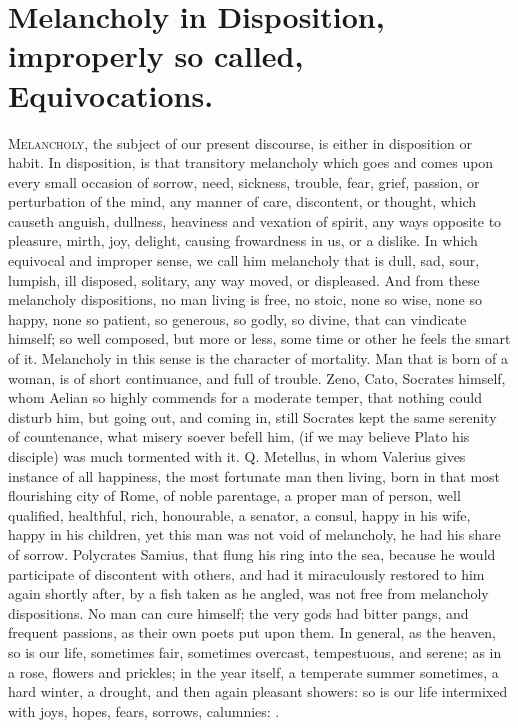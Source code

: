 {\section[Melancholic Disposition]{Melancholy in Disposition, improperly so called, Equivocations.}
\lettrine{M}{elancholy}, the subject of our present discourse, is either in
disposition or habit. In disposition, is that transitory melancholy
which goes and comes upon every small occasion of sorrow, need,
sickness, trouble, fear, grief, passion, or perturbation of the mind,
any manner of care, discontent, or thought, which causeth anguish,
dullness, heaviness and vexation of spirit, any ways opposite to
pleasure, mirth, joy, delight, causing frowardness in us, or a dislike.
In which equivocal and improper sense, we call him melancholy that is
dull, sad, sour, lumpish, ill disposed, solitary, any way moved, or
displeased. And from these melancholy dispositions, no man living
is free, no stoic, none so wise, none so happy, none so patient, so
generous, so godly, so divine, that can vindicate himself; so well
composed, but more or less, some time or other he feels the smart of
it. Melancholy in this sense is the character of mortality. Man
that is born of a woman, is of short continuance, and full of trouble.
Zeno, Cato, Socrates himself, whom Aelian so highly commends for a
moderate temper, that nothing could disturb him, but going out, and
coming in, still Socrates kept the same serenity of countenance, what
misery soever befell him, (if we may believe Plato his disciple) was
much tormented with it. Q. Metellus, in whom Valerius gives
instance of all happiness, the most fortunate man then living, born in
that most flourishing city of Rome, of noble parentage, a proper man of
person, well qualified, healthful, rich, honourable, a senator, a
consul, happy in his wife, happy in his children, \etc{} yet this man was
not void of melancholy, he had his share of sorrow. Polycrates
Samius, that flung his ring into the sea, because he would participate
of discontent with others, and had it miraculously restored to him
again shortly after, by a fish taken as he angled, was not free from
melancholy dispositions. No man can cure himself; the very gods had
bitter pangs, and frequent passions, as their own poets put upon
them. In general, as the heaven, so is our life, sometimes fair,
sometimes overcast, tempestuous, and serene; as in a rose, flowers and
prickles; in the year itself, a temperate summer sometimes, a hard
winter, a drought, and then again pleasant showers: so is our life
intermixed with joys, hopes, fears, sorrows, calumnies: .

}

